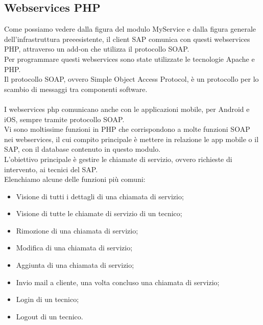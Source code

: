\subsection{Webservices PHP}
Come possiamo vedere dalla figura del modulo MyService e dalla figura generale dell'infrastruttura preeesistente, il client SAP comunica con questi webservices PHP, attraverso un add-on che utilizza il protocollo SOAP.\\
Per programmare questi webservices sono state utilizzate le tecnologie Apache e PHP.\\ 
Il protocollo SOAP, ovvero Simple Object Access Protocol, è un protocollo per lo scambio di messaggi tra componenti software.\\\\
I webservices php comunicano anche con le applicazioni mobile, per Android e iOS, sempre tramite protocollo SOAP.\\
Vi sono moltissime funzioni in PHP che corrispondono a molte funzioni SOAP nei webservices, il cui compito principale è mettere in relazione le app mobile o il SAP, con il database contenuto in questo modulo.\\
L'obiettivo principale è gestire le chiamate di servizio, ovvero richieste di intervento, ai tecnici del SAP.\\
Elenchiamo alcune delle funzioni più comuni:
\begin{itemize}
	\item Visione di tutti i dettagli di una chiamata di servizio;
	\item Visione di tutte le chiamate di servizio di un tecnico;
	\item Rimozione di una chiamata di servizio;
	\item Modifica di una chiamata di servizio;
	\item Aggiunta di una chiamata di servizio;
	\item Invio mail a cliente, una volta concluso una chiamata di servizio;
	\item Login di un tecnico;
	\item Logout di un tecnico.
\end{itemize}
\newpage
